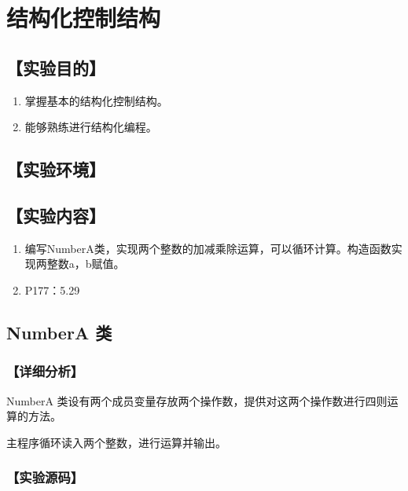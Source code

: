 \section{结构化控制结构}
\hfill{}
\subsection*{【实验目的】}
\begin{enumerate}[topsep=0pt,partopsep=0pt,itemsep=0pt,parsep=0pt,label={\arabic*、}]
\item 掌握基本的结构化控制结构。
\item 能够熟练进行结构化编程。
\end{enumerate}
\subsection*{【实验环境】}
\MyEnvironment
\subsection*{【实验内容】}
\begin{enumerate}[topsep=0pt,partopsep=0pt,itemsep=0pt,parsep=0pt,label={\arabic*、}]
\item 编写NumberA类，实现两个整数的加减乘除运算，可以循环计算。构造函数实现两整数a，b赋值。
\item P177：5.29
\end{enumerate}

\subsection{NumberA 类}
\subsubsection*{【详细分析】}
NumberA 类设有两个成员变量存放两个操作数，提供对这两个操作数进行四则运算的方法。

主程序循环读入两个整数，进行运算并输出。
\subsubsection*{【实验源码】}
{\linespread{1}}
